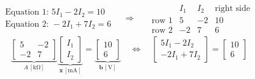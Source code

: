\documentclass[border=10pt]{standalone}
\begin{document}
\color{equationink}
\begin{minipage}{17cm}
\centering
\Large
\[
\begin{gathered}
\text{Equation 1: }5I_1-2I_2=10\\[0.22cm]
\text{Equation 2: }-2I_1+7I_2=6
\end{gathered}
\quad\Longrightarrow\quad
\begin{gathered}
\begin{array}{c|cc|c}
 & I_1 & I_2 & \text{right side}\\ \hline
\text{row 1} & 5 & -2 & 10\\
\text{row 2} & -2 & 7 & 6
\end{array}
\end{gathered}
\]
\[
\underbrace{\begin{bmatrix}5&-2\\-2&7\end{bmatrix}}_{A\,[\mathrm{k\Omega}]}
\underbrace{\begin{bmatrix}I_1\\I_2\end{bmatrix}}_{\mathbf{x}\,[\mathrm{mA}]}
=
\underbrace{\begin{bmatrix}10\\6\end{bmatrix}}_{\mathbf{b}\,[\mathrm{V}]}
\quad\Longleftrightarrow\quad
\begin{bmatrix}5I_1-2I_2\\-2I_1+7I_2\end{bmatrix}
=\begin{bmatrix}10\\6\end{bmatrix}
\]
\end{minipage}
\end{document}
